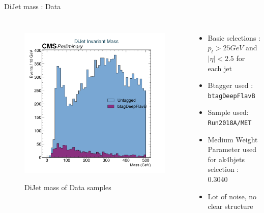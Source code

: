 \documentclass[10pt,xcolor=dvipsnames]{beamer}
\begin{document}
    
   \begin{frame}[fragile]{DiJet mass : Data} 
    \begin{columns}
    \begin{figure} 
    \centering 
     \includegraphics[width=1\textwidth]{../Archive/KinemPlots/DiJetsData.png }
    \label{DiJetData} 
    \caption{DiJet mass of Data samples}
    \end{figure} 
    \begin{itemize} 
    \raggedright 
    \small
    \item Basic selections : $p_t > 25 GeV $ and $|\eta | < 2.5 $ for each jet
    \item {Btagger used : \texttt{btagDeepFlavB}} 
    \item {Sample used: \texttt{Run2018A/MET}} 
    \item Medium Weight Parameter used for ak4bjets selection : 0.3040
    \item Lot of noise, no clear structure 
    \end{itemize}
    \end{columns} 
    \end{frame} 
    
\end{document}
